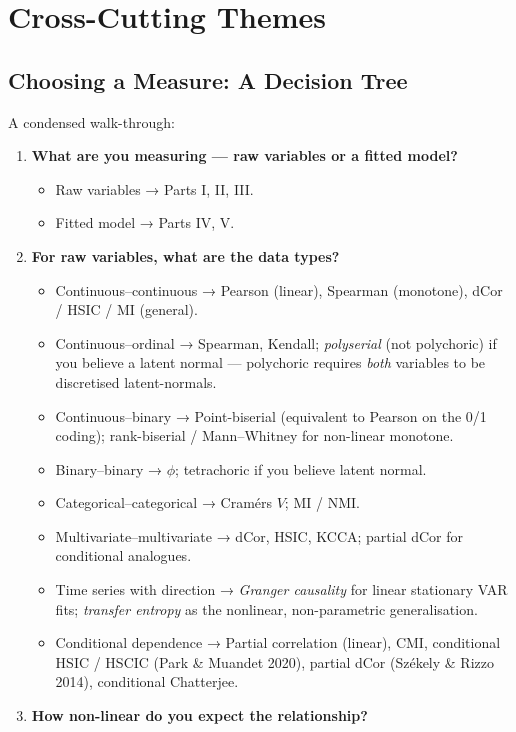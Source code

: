 \documentclass{article}
\providecommand{\tightlist}{\setlength{\itemsep}{0pt}\setlength{\parskip}{0pt}}
\let\oldsection\section
\renewcommand{\section}{\clearpage\oldsection}
\begin{document}
\section{Cross-Cutting Themes}\label{cross-cutting-themes}

\subsection{Choosing a Measure: A Decision
Tree}\label{choosing-a-measure-a-decision-tree}

A condensed walk-through:

\begin{enumerate}
\def\labelenumi{\arabic{enumi}.}
\item
  \textbf{What are you measuring --- raw variables or a fitted model?}

  \begin{itemize}
  \tightlist
  \item
    Raw variables → Parts I, II, III.
  \item
    Fitted model → Parts IV, V.
  \end{itemize}
\item
  \textbf{For raw variables, what are the data types?}

  \begin{itemize}
  \tightlist
  \item
    Continuous--continuous → Pearson (linear), Spearman (monotone), dCor
    / HSIC / MI (general).
  \item
    Continuous--ordinal → Spearman, Kendall; \emph{polyserial} (not
    polychoric) if you believe a latent normal --- polychoric requires
    \emph{both} variables to be discretised latent-normals.
  \item
    Continuous--binary → Point-biserial (equivalent to Pearson on the
    0/1 coding); rank-biserial / Mann--Whitney for non-linear monotone.
  \item
    Binary--binary → \(\phi\); tetrachoric if you believe latent normal.
  \item
    Categorical--categorical → Cramér\textquotesingle s \(V\); MI / NMI.
  \item
    Multivariate--multivariate → dCor, HSIC, KCCA; partial dCor for
    conditional analogues.
  \item
    Time series with direction → \emph{Granger causality} for linear
    stationary VAR fits; \emph{transfer entropy} as the nonlinear,
    non-parametric generalisation.
  \item
    Conditional dependence → Partial correlation (linear), CMI,
    conditional HSIC / HSCIC (Park \& Muandet 2020), partial dCor
    (Sz\'ekely \& Rizzo 2014), conditional Chatterjee.
  \end{itemize}
\item
  \textbf{How non-linear do you expect the relationship?}


\end{enumerate}
\end{document}
